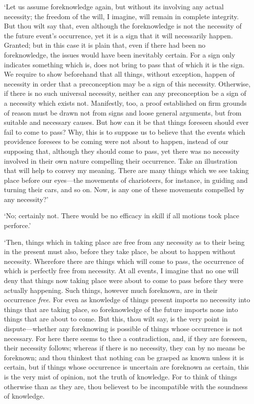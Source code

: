 \documentclass[12pt]{book}
\begin{document}
`Let us assume foreknowledge again, but without its involving any actual
necessity; the freedom of the will, I imagine, will remain in complete
integrity. But thou wilt say that, even although the foreknowledge is
not the necessity of the future event's occurrence, yet it is a sign
that it will necessarily happen. Granted; but in this case it is plain
that, even if there had been no foreknowledge, the issues would have
been inevitably certain. For a sign only indicates something which is,
does not bring to pass that of which it is the sign. We require to show
beforehand that all things, without exception, happen of necessity in
order that a preconception may be a sign of this necessity. Otherwise,
if there is no such universal necessity, neither can any preconception
be a sign of a necessity which exists not. Manifestly, too, a proof
established on firm grounds of reason must be drawn not from signs and
loose general arguments, but from suitable and necessary causes. But how
can it be that things foreseen should ever fail to come to pass? Why,
this is to suppose us to believe that the events which providence
foresees to be coming were not about to happen, instead of our supposing
that, although they should come to pass, yet there was no necessity
involved in their own nature compelling their occurrence. Take an
illustration that will help to convey my meaning. There are many things
which we see taking place before our eyes---the movements of charioteers,
for instance, in guiding and turning their cars, and so on. Now, is any
one of these movements compelled by any necessity?'

`No; certainly not. There would be no efficacy in skill if all motions
took place perforce.'

`Then, things which in taking place are free from any necessity as to
their being in the present must also, before they take place, be about
to happen without necessity. Wherefore there are things which will come
to pass, the occurrence of which is perfectly free from necessity. At
all events, I imagine that no one will deny that things now taking place
were about to come to pass before they were actually happening. Such
things, however much foreknown, are in their occurrence \emph{free}. For even
as knowledge of things present imports no necessity into things that are
taking place, so foreknowledge of the future imports none into things
that are about to come. But this, thou wilt say, is the very point in
dispute---whether any foreknowing is possible of things whose occurrence
is not necessary. For here there seems to thee a contradiction, and, if
they are foreseen, their necessity follows; whereas if there is no
necessity, they can by no means be foreknown; and thou thinkest that
nothing can be grasped as known unless it is certain, but if things
whose occurrence is uncertain are foreknown as certain, this is the very
mist of opinion, not the truth of knowledge. For to think of things
otherwise than as they are, thou believest to be incompatible with the
soundness of knowledge.
\end{document}
